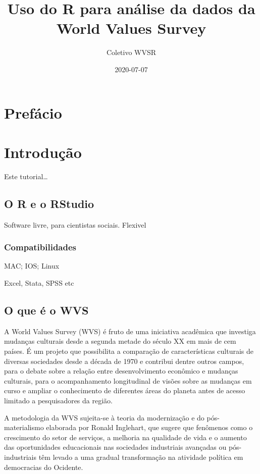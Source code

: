 \documentclass[
]{book}
\title{Uso do R para análise da dados da World Values Survey}
\author{Coletivo WVSR}
\date{2020-07-07}
\begin{document}
\maketitle

{
\setcounter{tocdepth}{1}
\tableofcontents
}
\hypertarget{prefuxe1cio}{%
\chapter{Prefácio}\label{prefuxe1cio}}

\hypertarget{intro}{%
\chapter{Introdução}\label{intro}}

Este tutorial\ldots{}

\hypertarget{o-r-e-o-rstudio}{%
\section{O R e o RStudio}\label{o-r-e-o-rstudio}}

Software livre, para cientistas sociais. Flexivel

\hypertarget{compatibilidades}{%
\subsection{Compatibilidades}\label{compatibilidades}}

MAC; IOS; Linux

Excel, Stata, SPSS etc

\hypertarget{o-que-uxe9-o-wvs}{%
\section{O que é o WVS}\label{o-que-uxe9-o-wvs}}

A World Values Survey (WVS) é fruto de uma iniciativa acadêmica que investiga mudanças culturais desde a segunda metade do século XX em mais de cem países. É um projeto que possibilita a comparação de características culturais de diversas sociedades desde a década de 1970 e contribui dentre outros campos, para o debate sobre a relação entre desenvolvimento econômico e mudanças culturais, para o acompanhamento longitudinal de visões sobre as mudanças em curso e ampliar o conhecimento de diferentes áreas do planeta antes de acesso limitado a pesquisadores da região.

A metodologia da WVS sujeita-se à teoria da modernização e do pós-materialismo elaborada por Ronald Inglehart, que sugere que fenômenos como o crescimento do setor de serviços, a melhoria na qualidade de vida e o aumento das oportunidades educacionais nas sociedades industriais avançadas ou pós-industriais têm levado a uma gradual transformação na atividade política em democracias do Ocidente.
\end{document}
